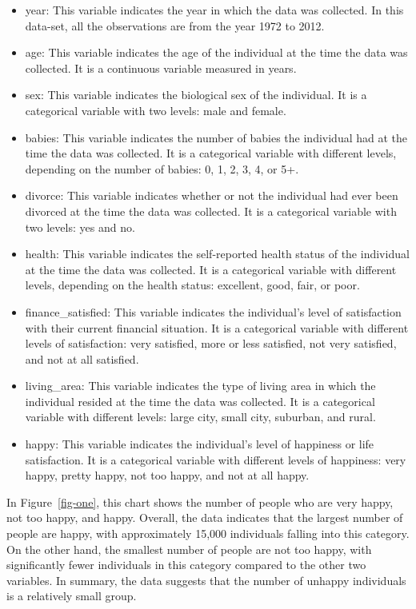 \documentclass[
  letterpaper,
  DIV=11,
  numbers=noendperiod]{scrartcl}
\providecommand{\tightlist}{%
  \setlength{\itemsep}{0pt}\setlength{\parskip}{0pt}}\usepackage{longtable,booktabs,array}
\begin{document}
\begin{itemize}
\tightlist
\item
  year: This variable indicates the year in which the data was
  collected. In this data-set, all the observations are from the year
  1972 to 2012.
\item
  age: This variable indicates the age of the individual at the time the
  data was collected. It is a continuous variable measured in years.
\item
  sex: This variable indicates the biological sex of the individual. It
  is a categorical variable with two levels: male and female.
\item
  babies: This variable indicates the number of babies the individual
  had at the time the data was collected. It is a categorical variable
  with different levels, depending on the number of babies: 0, 1, 2, 3,
  4, or 5+.
\item
  divorce: This variable indicates whether or not the individual had
  ever been divorced at the time the data was collected. It is a
  categorical variable with two levels: yes and no.
\item
  health: This variable indicates the self-reported health status of the
  individual at the time the data was collected. It is a categorical
  variable with different levels, depending on the health status:
  excellent, good, fair, or poor.
\item
  finance\_satisfied: This variable indicates the individual's level of
  satisfaction with their current financial situation. It is a
  categorical variable with different levels of satisfaction: very
  satisfied, more or less satisfied, not very satisfied, and not at all
  satisfied.
\item
  living\_area: This variable indicates the type of living area in which
  the individual resided at the time the data was collected. It is a
  categorical variable with different levels: large city, small city,
  suburban, and rural.
\item
  happy: This variable indicates the individual's level of happiness or
  life satisfaction. It is a categorical variable with different levels
  of happiness: very happy, pretty happy, not too happy, and not at all
  happy.
\end{itemize}

In Figure~\ref{fig-one}, this chart shows the number of people who are
very happy, not too happy, and happy. Overall, the data indicates that
the largest number of people are happy, with approximately 15,000
individuals falling into this category. On the other hand, the smallest
number of people are not too happy, with significantly fewer individuals
in this category compared to the other two variables. In summary, the
data suggests that the number of unhappy individuals is a relatively
small group.
\end{document}
